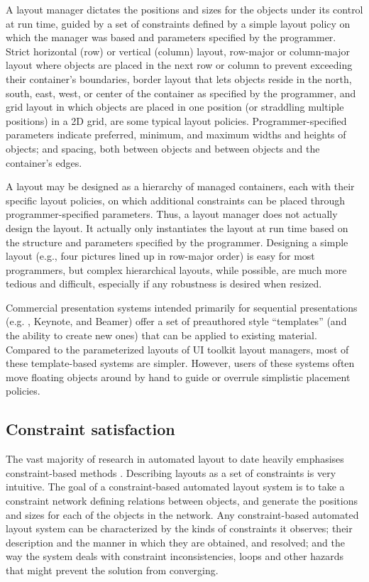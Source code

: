     A layout manager dictates the positions and sizes for the objects under its
    control at run time, guided by a set of constraints defined by a simple
    layout policy on which the manager was based and parameters specified by
    the programmer. Strict horizontal (row) or vertical (column) layout,
    row-major or column-major layout where objects are placed in the next row
    or column to prevent exceeding their container’s boundaries, border layout
    that lets objects reside in the north, south, east, west, or center of the
    container as specified by the programmer, and grid layout in which objects
    are placed in one position (or straddling multiple positions) in a 2D grid,
    are some typical layout policies. Programmer-specified parameters indicate
    preferred, minimum, and maximum widths and heights of objects; and spacing,
    both between objects and between objects and the container’s edges. 

    A layout may be designed as a hierarchy of managed containers, each with
    their specific layout policies, on which additional constraints can be
    placed through programmer-specified parameters. Thus, a layout manager
    does not actually design the layout. It actually only instantiates the
    layout at run time based on the structure and parameters specified by the
    programmer. Designing a simple layout (e.g., four pictures lined up in
    row-major order) is easy for most programmers, but complex hierarchical
    layouts, while possible, are much more tedious and difficult, especially if
    any robustness is desired when resized.

    Commercial presentation systems intended primarily for sequential
    presentations (e.g. \ppt, Keynote, and \latex Beamer) offer a set of
    preauthored style “templates” (and the ability to create new ones) that can
    be applied to existing material. Compared to the parameterized layouts of
    UI toolkit layout managers, most of these template-based systems are
    simpler. However, users of these systems often move floating objects
    around by hand to guide or overrule simplistic placement policies.

   \subsection{Constraint satisfaction}
    \label{constraint-satisfaction}

    The vast majority of research in automated layout to date heavily
    emphasises constraint-based methods
    \citep{vanderzanden-1,borning-1,graf-1,hudson-3,kochhar-1,hudson-2,weitzman-2,myers-2}.
    Describing layouts as a set of constraints is very intuitive. The goal of a
    constraint-based automated layout system is to take a constraint network
    defining relations between objects, and generate the positions and sizes
    for each of the objects in the network. Any constraint-based automated
    layout system can be characterized by the kinds of constraints it observes;
    their description and the manner in which they are obtained, and resolved;
    and the way the system deals with constraint inconsistencies, loops and
    other hazards that might prevent the solution from converging.

